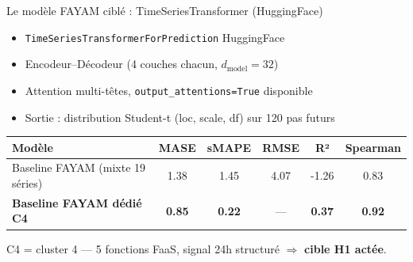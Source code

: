 \documentclass[10pt]{beamer}
\begin{document}
\begin{frame}{Le modèle FAYAM ciblé : TimeSeriesTransformer (HuggingFace)}
  \begin{tcolorbox}[colback=fayam!8, colframe=fayam!70!black, arc=3mm,
                    fonttitle=\bfseries, title=Architecture FAYAM Modèle 2]
    \begin{itemize}
      \item \texttt{TimeSeriesTransformerForPrediction} HuggingFace
      \item Encodeur--Décodeur (4 couches chacun, $d_{\text{model}} = 32$)
      \item Attention multi-têtes, \texttt{output\_attentions=True} disponible
      \item Sortie : distribution Student-t (loc, scale, df) sur 120 pas futurs
    \end{itemize}
  \end{tcolorbox}

  \vspace{4pt}

  \begin{tcolorbox}[colback=blue!3, colframe=blue!50!black, arc=2mm,
                    fonttitle=\bfseries, title={Notre baseline reproduite (Phase 1, mai 2026)}]
    \begin{tabular}{lccccc}
      \toprule
      \textbf{Modèle} & \textbf{MASE} & \textbf{sMAPE} & \textbf{RMSE} & \textbf{R²} & \textbf{Spearman} \\
      \midrule
      Baseline FAYAM (mixte 19 séries) & 1.38 & 1.45 & 4.07 & -1.26 & 0.83 \\
      \textbf{Baseline FAYAM dédié C4} & \textbf{0.85} & \textbf{0.22} & — & \textbf{0.37} & \textbf{0.92} \\
      \bottomrule
    \end{tabular}

    \vspace{4pt}
    {\footnotesize C4 = cluster 4 — 5 fonctions FaaS, signal 24h structuré $\Rightarrow$ \textbf{cible H1 actée}.}
  \end{tcolorbox}
\end{frame}
\end{document}

